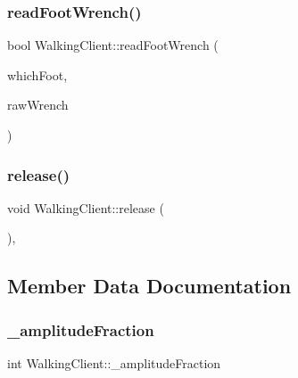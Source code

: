 \subsubsection{\texorpdfstring{read\+Foot\+Wrench()}{readFootWrench()}}
{\footnotesize\ttfamily bool Walking\+Client\+::read\+Foot\+Wrench (\begin{DoxyParamCaption}\item[{\hyperlink{ZmpController_8h_a4b6a8e135f90bd56e5a57a60efb42529}{F\+O\+OT}}]{which\+Foot,  }\item[{Eigen\+::\+Vector\+Xd \&}]{raw\+Wrench }\end{DoxyParamCaption})}

\hypertarget{classWalkingClient_a3b36da9d7649865a13c9318dd73ebc7e}{}\label{classWalkingClient_a3b36da9d7649865a13c9318dd73ebc7e} 
\subsubsection{\texorpdfstring{release()}{release()}}
{\footnotesize\ttfamily void Walking\+Client\+::release (\begin{DoxyParamCaption}{ }\end{DoxyParamCaption})\hspace{0.3cm}{\ttfamily [protected]}, {\ttfamily [virtual]}}



\subsection{Member Data Documentation}
\hypertarget{classWalkingClient_ac548ce03ea9ceffb4b42981942f66dd0}{}\label{classWalkingClient_ac548ce03ea9ceffb4b42981942f66dd0} 
\subsubsection{\texorpdfstring{\+\_\+amplitude\+Fraction}{\_amplitudeFraction}}
{\footnotesize\ttfamily int Walking\+Client\+::\+\_\+amplitude\+Fraction\hspace{0.3cm}{\ttfamily [private]}}

\hypertarget{classWalkingClient_aff02b341d5e1f500dc9a849337319a8d}{}\label{classWalkingClient_aff02b341d5e1f500dc9a849337319a8d} 

